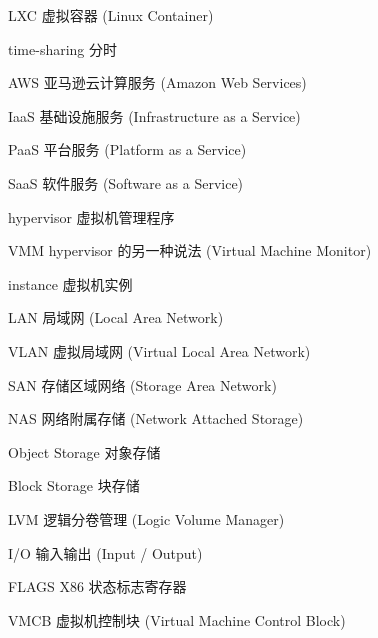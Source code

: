\begin{denotation}[3cm]
\item[LXC] 虚拟容器 (Linux Container)
\item[time-sharing] 分时
\item[AWS] 亚马逊云计算服务 (Amazon Web Services)
\item[IaaS] 基础设施服务 (Infrastructure as a Service)
\item[PaaS] 平台服务 (Platform as a Service)
\item[SaaS] 软件服务 (Software as a Service)
\item[hypervisor] 虚拟机管理程序
\item[VMM] hypervisor 的另一种说法 (Virtual Machine Monitor)
\item[instance] 虚拟机实例
\item[LAN] 局域网 (Local Area Network)
\item[VLAN] 虚拟局域网 (Virtual Local Area Network)
\item[SAN] 存储区域网络 (Storage Area Network)
\item[NAS] 网络附属存储 (Network Attached Storage)
\item[Object Storage] 对象存储
\item[Block Storage] 块存储
\item[LVM] 逻辑分卷管理 (Logic Volume Manager)
\item[I/O] 输入输出 (Input / Output)
\item[FLAGS] X86 状态标志寄存器
\item[VMCB] 虚拟机控制块 (Virtual Machine Control Block)
\end{denotation}
